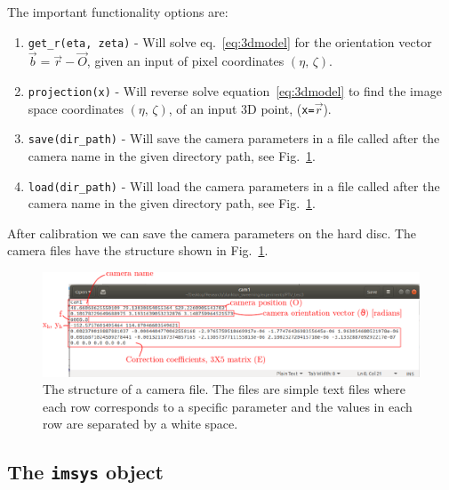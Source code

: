 \documentclass[10pt,a4paper]{article}
\begin{document}
The important functionality options are:


\begin{enumerate}
	\item \texttt{get\_r(eta, zeta)} - Will solve eq.~\ref{eq:3dmodel} for the orientation vector $\vec{b} = \vec{r} - \vec{O}$, given an input of pixel coordinates $(\eta, \, \zeta)$.
	
	\item \texttt{projection(x)} - Will reverse solve equation~\eqref{eq:3dmodel} to find the image space coordinates $(\eta, \, \zeta)$, of an input 3D point, (\texttt{x=}$\vec{r}$).
	
	\item \texttt{save(dir\_path)} - Will save the camera parameters in a file called after the camera name in the given directory path, see Fig.~\ref{fig:camfiles}.
	
	\item \texttt{load(dir\_path)} - Will load the camera parameters in a file called after the camera name in the given directory path, see Fig.~\ref{fig:camfiles}.
\end{enumerate}



After calibration we can save the camera parameters on the hard disc. The camera files have the structure shown in Fig.~\ref{fig:camfiles}.

\begin{figure}[!ht]
	\centering
	\includegraphics[width=\textwidth]{camera_files.pdf}
	\caption{The structure of a camera file. The files are simple text files where each row corresponds to a specific parameter and the values in each row are separated by a white space. \label{fig:camfiles}}
\end{figure}








\subsection{The \texttt{imsys} object}
\end{document}
